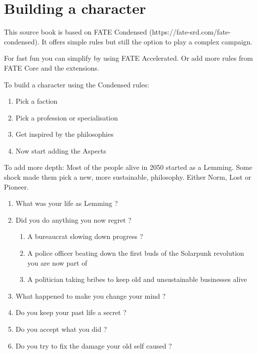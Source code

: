 \chapter{Building a character}

This source book is based on FATE Condensed (https://fate-srd.com/fate-condensed). It offers simple rules but still the option to play a complex campaign.

For fast fun you can simplify by using FATE Accelerated.
Or add more rules from FATE Core and the extensions.

To build a character using the Condensed rules:

\begin{enumerate}
    \item Pick a faction
    \item Pick a profession or specialisation
    \item Get inspired by the philosophies
    \item Now start adding the Aspects
\end{enumerate}

To add more depth: Most of the people alive in 2050 started as a Lemming. Some shock made them pick a new, more sustainable, philosophy. Either Norm, Lost or Pioneer.

\begin{enumerate}
    \item What was your life as Lemming ?
    \item Did you do anything you now regret ?
    \begin{enumerate}
        \item A bureaucrat slowing down progress ?
        \item A police officer beating down the first buds of the Solarpunk revolution you are now part of
        \item A politician taking bribes to keep old and unsustainable businesses alive 
    \end{enumerate}
    \item What happened to make you change your mind ?
    \item Do you keep your past life a secret ?
    \item Do you accept what you did ?
    \item Do you try to fix the damage your old self caused ?
\end{enumerate}
